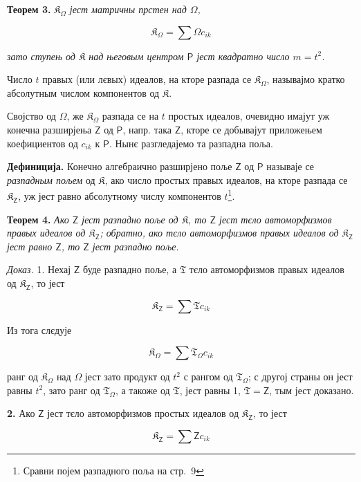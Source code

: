 \documentclass[11pt]{article}
\newcommand{\srcfn}[2]{\footnote{#2}}
\begin{document}
\textbf{Теорем 3.} \emph{\(\mathfrak K_\Omega\) јест матричны прстен над \(\Omega\),}

\[
\mathfrak K_\Omega=\sum\Omega c_{ik}
\]

\emph{зато ступењ од \(\mathfrak K\) над његовым центром \(\mathsf P\) јест квадратно число \(m=t^2\).}

Число \(t\) правых (или лєвых) идеалов, на кторе разпада се \(\mathfrak K_\Omega\), называјмо кратко абсолутным числом компонентов од \(\mathfrak K\).

Својство од \(\Omega\), же \(\mathfrak K_\Omega\) разпада се на \(t\) простых идеалов, очевидно имајут уж конечна разширјења \(\mathsf{Z}\) од \(\mathsf P\), напр. така \(\mathsf{Z}\), кторе се добывајут приложењем коефициентов од \(c_{ik}\) к \(\mathsf P\). Нынє разгледајемо та разпадна поља.

\textbf{Дефиниција.} Конечно алгебраично разширјено поље \(\mathsf{Z}\) од \(\mathsf P\) называје се \emph{разпадным пољем} од \(\mathfrak K\), ако число простых правых идеалов, на кторе разпада се \(\mathfrak K_{\mathsf{Z}}\), уж јест равно абсолутному числу компонентов \(t\)\srcfn{1}{Сравни појем разпадного поља на стр.~9}.

\textbf{Теорем 4.} \emph{Ако \(\mathsf{Z}\) јест разпадно поље од \(\mathfrak K\), то \(\mathsf{Z}\) јест тєло автоморфизмов правых идеалов од \(\mathfrak K_{\mathsf{Z}}\); обратно, ако тєло автоморфизмов правых идеалов од \(\mathfrak K_{\mathsf{Z}}\) јест равно \(\mathsf{Z}\), то \(\mathsf{Z}\) јест разпадно поље.}

\emph{Доказ.} 1. Нехај \(\mathsf{Z}\) буде разпадно поље, а \(\mathfrak T\) тєло автоморфизмов правых идеалов од \(\mathfrak K_{\mathsf{Z}}\), то јест

\[
\mathfrak K_{\mathsf{Z}}=\sum\mathfrak T c_{ik}
\]

Из тога слєдује

\[
\mathfrak K_\Omega=\sum\mathfrak T_\Omega c_{ik}
\]

ранг од \(\mathfrak K_\Omega\) над \(\Omega\) јест зато продукт од \(t^2\) с рангом од \(\mathfrak T_\Omega\); с другој страны он јест равны \(t^2\), зато ранг од \(\mathfrak T_\Omega\), а такоже од \(\mathfrak T\), јест равны 1, \(\mathfrak T=\mathsf{Z}\), тым јест доказано.

\textbf{2.} Ако \(\mathsf{Z}\) јест тєло автоморфизмов простых идеалов од \(\mathfrak K_{\mathsf{Z}}\), то јест

\[
\mathfrak K_{\mathsf{Z}}=\sum\mathsf Zc_{ik}
\]
\end{document}
